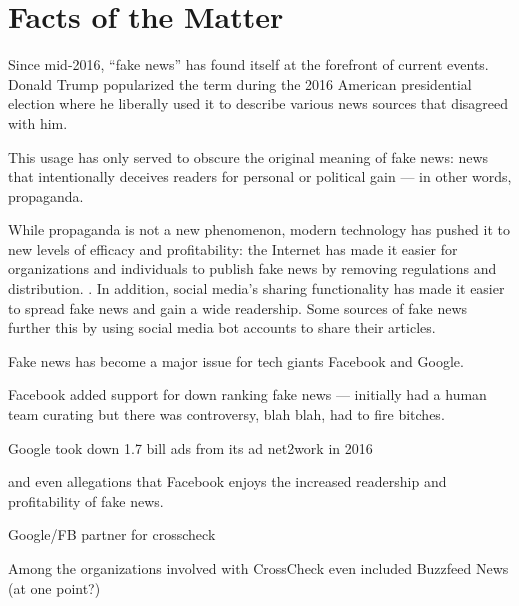 

\section{Facts of the Matter}


Since mid-2016, ``fake news'' has found itself at the forefront of current events. \cite{telegraph_fake_news} Donald Trump popularized the term during the 2016 American presidential election where he liberally used it to describe various news sources that disagreed with him. \cite{tc_what_is_fake_news}

This usage has only served to obscure the original meaning of fake news: news that intentionally deceives readers for personal or political gain \cite{tc_what_is_fake_news }\cite{npr_fake_news} --- in other words, propaganda. \cite{telegraph_fake_news}

While propaganda is not a new phenomenon, modern technology has pushed it to new levels of efficacy and profitability: the Internet has made it easier for organizations and individuals to publish fake news by removing regulations and distribution. \cite{telegraph_fake_news}. In addition, social media's sharing functionality has made it easier to spread fake news and gain a wide readership. \cite{cbs_fake_news} Some sources of fake news further this by using social media bot accounts to share their articles. \cite{cbs_fake_news}

Fake news has become a major issue for tech giants Facebook and Google. \cite{bbc_facebook_fake_news_crisis}

Facebook added support for down ranking fake news --- initially had a human team curating but there was controversy, blah blah, had to fire bitches. \cite{tc_fb_down_ranks_fake_news}

Google took down 1.7 bill ads from its ad net2work in 2016 \cite{tc_google_took_down_ads}

and even allegations that Facebook enjoys the increased readership and profitability of fake news. \cite{tc_facebook_responsibility}

Google/FB partner for crosscheck \cite{tc_google_fb_partner}

Among the organizations involved with CrossCheck even included Buzzfeed News (at one point?) \cite{pcw_france_google_facebook}

